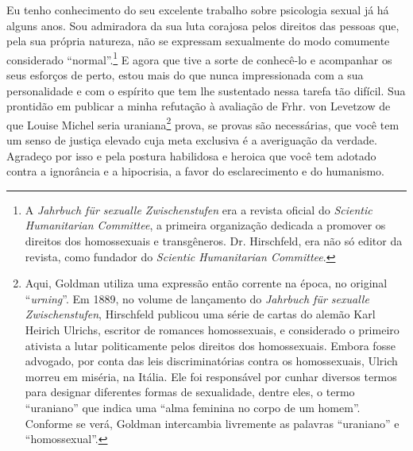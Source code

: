 Eu tenho conhecimento do seu excelente trabalho sobre psicologia sexual
já há alguns anos. Sou admiradora da sua luta corajosa pelos direitos
das pessoas que, pela sua própria natureza, não se expressam sexualmente
do modo comumente considerado ``normal''.\footnote{A \emph{Jahrbuch für
  sexualle Zwischenstufen} era a revista oficial do \emph{Scientic
  Humanitarian Committee}, a primeira organização dedicada a promover os
  direitos dos homossexuais e transgêneros. Dr. Hirschfeld, era não só
  editor da revista, como fundador do \emph{Scientic Humanitarian
  Committee}.} E agora que tive a sorte de conhecê-lo e acompanhar os
seus esforços de perto, estou mais do que nunca impressionada com a sua
personalidade e com o espírito que tem lhe sustentado nessa tarefa tão
difícil. Sua prontidão em publicar a minha refutação à avaliação de
Frhr. von Levetzow de que Louise Michel seria uraniana\footnote{Aqui,
  Goldman utiliza uma expressão então corrente na época, no original
  ``\emph{urning}''. Em 1889, no volume de lançamento do \emph{Jahrbuch
  für sexualle Zwischenstufen}, Hirschfeld publicou uma série de cartas
  do alemão Karl Heirich Ulrichs, escritor de romances homossexuais, e
  considerado o primeiro ativista a lutar politicamente pelos direitos
  dos homossexuais. Embora fosse advogado, por conta das leis
  discriminatórias contra os homossexuais, Ulrich morreu em miséria, na
  Itália. Ele foi responsável por cunhar diversos termos para designar
  diferentes formas de sexualidade, dentre eles, o termo ``uraniano''
  que indica uma ``alma feminina no corpo de um homem''. Conforme se
  verá, Goldman intercambia livremente as palavras ``uraniano'' e
  ``homossexual''.} prova, se provas são necessárias, que você tem um
senso de justiça elevado cuja meta exclusiva é a averiguação da verdade.
Agradeço por isso e pela postura habilidosa e heroica que você tem
adotado contra a ignorância e a hipocrisia, a favor do esclarecimento e
do humanismo.

